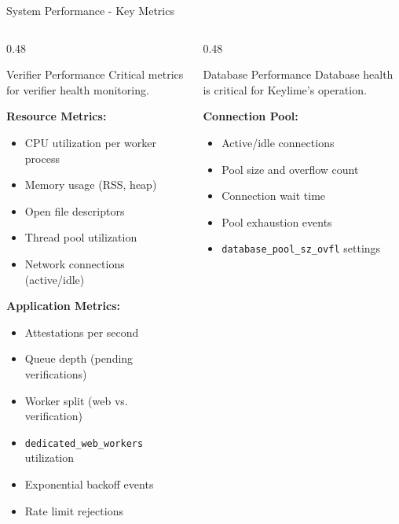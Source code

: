 \begin{frame}{System Performance - Key Metrics}
  \begin{columns}[T]
    \begin{column}{0.48\textwidth}
      \begin{block}{Verifier Performance}
        \scriptsize
        Critical metrics for verifier health monitoring.
      \end{block}

      \vspace{0.1cm}
      \scriptsize

      \textbf{Resource Metrics:}
      \begin{itemize}
        \item CPU utilization per worker process
        \item Memory usage (RSS, heap)
        \item Open file descriptors
        \item Thread pool utilization
        \item Network connections (active/idle)
      \end{itemize}

      \vspace{0.1cm}

      \textbf{Application Metrics:}
      \begin{itemize}
        \item Attestations per second
        \item Queue depth (pending verifications)
        \item Worker split (web vs. verification)
        \item \texttt{dedicated\_web\_workers} utilization
        \item Exponential backoff events
        \item Rate limit rejections
      \end{itemize}
    \end{column}
    \begin{column}{0.48\textwidth}
      \begin{block}{Database Performance}
        \scriptsize
        Database health is critical for Keylime's operation.
      \end{block}

      \vspace{0.1cm}
      \scriptsize

      \textbf{Connection Pool:}
      \begin{itemize}
        \item Active/idle connections
        \item Pool size and overflow count
        \item Connection wait time
        \item Pool exhaustion events
        \item \texttt{database\_pool\_sz\_ovfl} settings
      \end{itemize}


\end{column}
\end{columns}
\end{frame}
